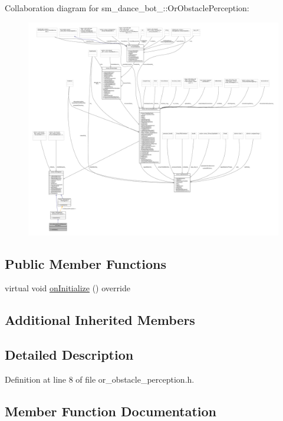 Collaboration diagram for sm\+\_\+dance\+\_\+bot\+\_\+:\+:Or\+Obstacle\+Perception\+:
\nopagebreak
\begin{figure}[H]
\begin{center}
\leavevmode
\includegraphics[width=350pt]{classsm__dance__bot__3_1_1OrObstaclePerception__coll__graph}
\end{center}
\end{figure}
\subsection*{Public Member Functions}
\begin{DoxyCompactItemize}
\item 
virtual void \hyperlink{classsm__dance__bot__3_1_1OrObstaclePerception_a06084ec8657c09b4ea650d6242ba0d61}{on\+Initialize} () override
\end{DoxyCompactItemize}
\subsection*{Additional Inherited Members}


\subsection{Detailed Description}


Definition at line 8 of file or\+\_\+obstacle\+\_\+perception.\+h.



\subsection{Member Function Documentation}
